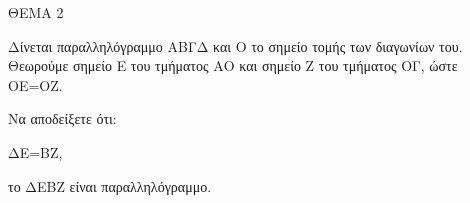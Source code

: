 
ΘΕΜΑ 2

Δίνεται παραλληλόγραμμο ΑΒΓΔ και Ο το σημείο τομής των διαγωνίων του. Θεωρούμε σημείο Ε του τμήματος ΑΟ και σημείο Ζ του τμήματος ΟΓ, ώστε ΟΕ=ΟΖ.

Να αποδείξετε ότι:

\begin{alist}
\item ΔΕ=ΒΖ, 

\item το ΔΕΒΖ είναι παραλληλόγραμμο. 
\end{alist}
